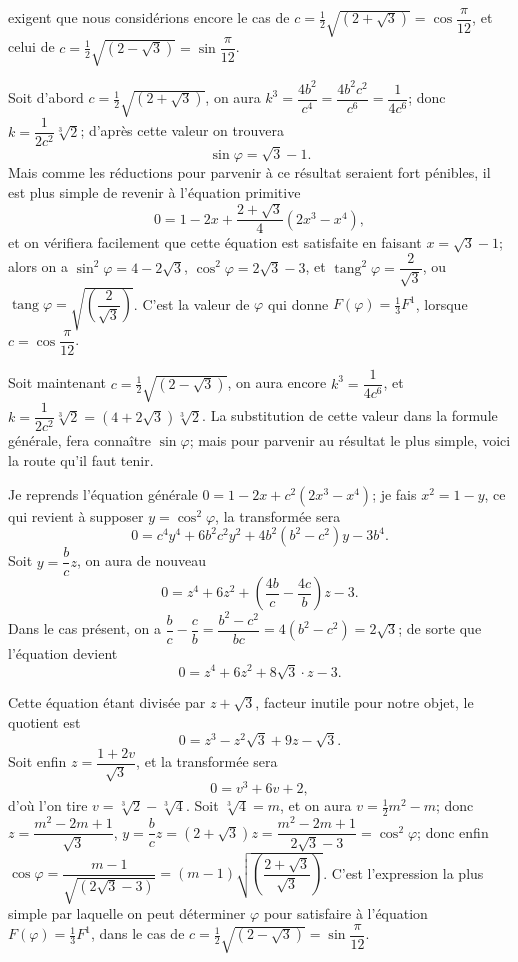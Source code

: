 \documentclass{article}
\begin{document}
exigent que nous considérions encore le cas de $c=\frac{1}{2}\sqrt{(2+\sqrt{3})}=\cos\dfrac{\pi}{12}$, et celui de $c=\frac{1}{2}\sqrt{(2-\sqrt{3})}=\sin\dfrac{\pi}{12}$.

Soit d'abord $c=\frac{1}{2}\sqrt{(2+\sqrt{3})}$, on aura $k^{3}=\dfrac{4b^{2}}{c^{4}}=\dfrac{4b^{2}c^{2}}{c^{6}}=\dfrac{1}{4c^{6}}$; donc $k=\dfrac{1}{2c^{2}}\sqrt[3]{2}$; d'après cette valeur on trouvera
\[ \sin\varphi=\sqrt{3}-1. \]
Mais comme les réductions pour parvenir à ce résultat seraient fort pénibles, il est plus simple de revenir à l'équation primitive
\[ 0=1-2x+\frac{2+\sqrt{3}}{4}(2x^{3}-x^{4}), \]
et on vérifiera facilement que cette équation est satisfaite en faisant $x=\sqrt{3}-1$; alors on a $\sin^{2}\varphi=4-2\sqrt{3}$, $\cos^{2}\varphi=2\sqrt{3}-3$, et $\operatorname{tang}^{2}\varphi=\dfrac{2}{\sqrt{3}}$, ou $\operatorname{tang}\varphi=\sqrt{\left(\dfrac{2}{\sqrt{3}}\right)}$. C'est la valeur de $\varphi$ qui donne $F(\varphi)=\frac{1}{3}F^{1}$, lorsque $c=\cos\dfrac{\pi}{12}$.

Soit maintenant $c=\frac{1}{2}\sqrt{(2-\sqrt{3})}$, on aura encore $k^{3}=\dfrac{1}{4c^{6}}$, et $k=\dfrac{1}{2c^{2}}\sqrt[3]{2}=(4+2\sqrt{3})\sqrt[3]{2}$.
La substitution de cette valeur dans la formule générale, fera connaître $\sin\varphi$; mais pour parvenir au résultat le plus simple, voici la route qu'il faut tenir.

Je reprends l'équation générale $0=1-2x+c^{2}(2x^{3}-x^{4})$; je fais $x^{2}=1-y$, ce qui revient à supposer $y=\cos^{2}\varphi$, la transformée sera
\[ 0=c^{4}y^{4}+6b^{2}c^{2}y^{2}+4b^{2}(b^{2}-c^{2})y-3b^{4}. \]
Soit $y=\dfrac{b}{c}z$, on aura de nouveau
\[ 0=z^{4}+6z^{2}+\left(\frac{4b}{c}-\frac{4c}{b}\right)z-3. \]
Dans le cas présent, on a $\dfrac{b}{c}-\dfrac{c}{b}=\dfrac{b^{2}-c^{2}}{bc}=4(b^{2}-c^{2})=2\sqrt{3}$; de sorte que l'équation devient
\[ 0=z^{4}+6z^{2}+8\sqrt{3}\cdot z-3. \]

Cette équation étant divisée par $z+\sqrt{3}$, facteur inutile pour notre objet, le quotient est
\[ 0=z^{3}-z^{2}\sqrt{3}+9z-\sqrt{3}. \]
Soit enfin $z=\dfrac{1+2v}{\sqrt{3}}$, et la transformée sera
\[ 0=v^{3}+6v+2, \]
d'où l'on tire $v=\sqrt[3]{2}-\sqrt[3]{4}$. Soit $\sqrt[3]{4}=m$, et on aura $v=\frac{1}{2}m^{2}-m$; donc $z=\dfrac{m^{2}-2m+1}{\sqrt{3}}$, $y=\dfrac{b}{c}z=(2+\sqrt{3})z=\dfrac{m^{2}-2m+1}{2\sqrt{3}-3}=\cos^{2}\varphi$; donc enfin $\cos\varphi=\dfrac{m-1}{\sqrt{(2\sqrt{3}-3)}}=(m-1)\sqrt{\left(\dfrac{2+\sqrt{3}}{\sqrt{3}}\right)}$. C'est l'expression la plus simple par laquelle on peut déterminer $\varphi$ pour satisfaire à l'équation $F(\varphi)=\frac{1}{3}F^{1}$, dans le cas de $c=\frac{1}{2}\sqrt{(2-\sqrt{3})}=\sin\dfrac{\pi}{12}$.
\end{document}
